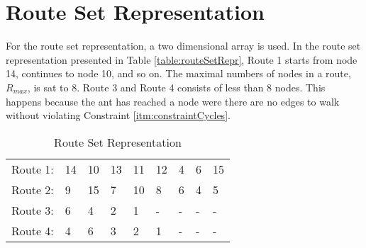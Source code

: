 \section{Route Set Representation}
For the route set representation, a two dimensional array is used. In the route set representation presented in Table \vref{table:routeSetRepr}, Route 1 starts from node 14, continues to node 10, and so on. The maximal numbers of nodes in a route, $R_{max}$, is sat to 8. Route 3 and Route 4 consists of less than 8 nodes. This happens because the ant has reached a node were there are no edges to walk without violating Constraint \vref{itm:constraintCycles}.
\begin{table}[H]
    \begin{center}
        \begin{tabular}{|l| l l l l l l l l|}
      \hline
        Route 1: & 14 & 10 & 13 & 11 & 12 & 4 & 6 & 15 \\
        Route 2: & 9 & 15 & 7 & 10 & 8 & 6 & 4 & 5 \\
        Route 3: & 6 & 4 & 2 & 1 & - & - & - & - \\
        Route 4: & 4 & 6 & 3 & 2 & 1 & - & - & - \\
      \hline
        \end{tabular}
    \end{center}
    \caption {Route Set Representation}
    \label{table:routeSetRepr}
\end{table}